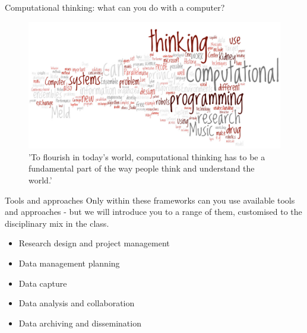 \documentclass[aspectratio=169, 11pt]{beamer} %
\begin{document}
\begin{frame}{Computational thinking: what can you do with a computer?}
\begin{figure}[H]
        \centering
        \includegraphics[height=.6\textheight]{figures/ctc-w2b.jpg}
        \caption{'To flourish in today's world, computational thinking has to be a fundamental part of the way people think and understand the world.' \cite{Center_for_Computational_Thinking2012-tt}}
        \label{fig:ctc}
    \end{figure}

\end{frame}

\begin{frame}{Tools and approaches}
Only within these frameworks can you use available tools and approaches - but we will introduce you to a range of them, customised to the disciplinary mix in the class.
    \begin{itemize}[label=\textbullet]
        \item Research design and project management
        \item Data management planning
        \item Data capture
        \item Data analysis and collaboration
        \item Data archiving and dissemination
    \end{itemize}

\end{frame}
\end{document}
